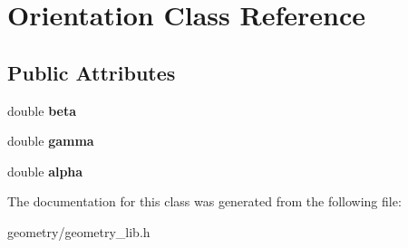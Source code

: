 \hypertarget{class_orientation}{}\section{Orientation Class Reference}
\label{class_orientation}
\subsection*{Public Attributes}
\begin{DoxyCompactItemize}
\item 
\mbox{\label{class_orientation_acffab8b9c7a0f6b4a5e24d049f736abe}} 
double {\bfseries beta}
\item 
\mbox{\label{class_orientation_aa745459cdf332f9ad128d2194ce02f9d}} 
double {\bfseries gamma}
\item 
\mbox{\label{class_orientation_a6c74f24ac48bd9fdbada2ae67860afe1}} 
double {\bfseries alpha}
\end{DoxyCompactItemize}


The documentation for this class was generated from the following file\+:\begin{DoxyCompactItemize}
\item 
geometry/geometry\+\_\+lib.\+h\end{DoxyCompactItemize}
